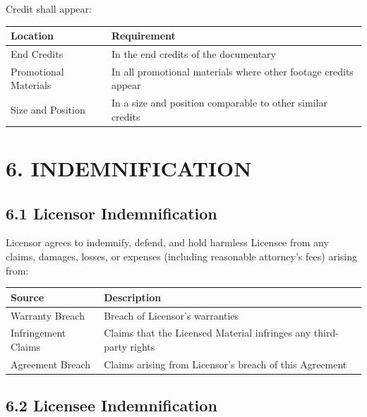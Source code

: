 \documentclass[
  11pt,
]{article}
\begin{document}
Credit shall appear:

\begin{table}[h]
\centering
\begin{tabular}{L{3.5cm}L{10.5cm}}
\toprule
\textbf{Location} & \textbf{Requirement} \\
\midrule
End Credits & In the end credits of the documentary \\
Promotional Materials & In all promotional materials where other footage credits appear \\
Size and Position & In a size and position comparable to other similar credits \\
\bottomrule
\end{tabular}
\end{table}

\hypertarget{indemnification}{%
\section{6. INDEMNIFICATION}\label{indemnification}}

\hypertarget{licensor-indemnification}{%
\subsection{6.1 Licensor
Indemnification}\label{licensor-indemnification}}

Licensor agrees to indemnify, defend, and hold harmless Licensee from
any claims, damages, losses, or expenses (including reasonable
attorney's fees) arising from:

\begin{table}[h]
\centering
\begin{tabular}{L{3.5cm}L{10.5cm}}
\toprule
\textbf{Source} & \textbf{Description} \\
\midrule
Warranty Breach & Breach of Licensor's warranties \\
Infringement Claims & Claims that the Licensed Material infringes any third-party rights \\
Agreement Breach & Claims arising from Licensor's breach of this Agreement \\
\bottomrule
\end{tabular}
\end{table}

\hypertarget{licensee-indemnification}{%
\subsection{6.2 Licensee
Indemnification}\label{licensee-indemnification}}
\end{document}
